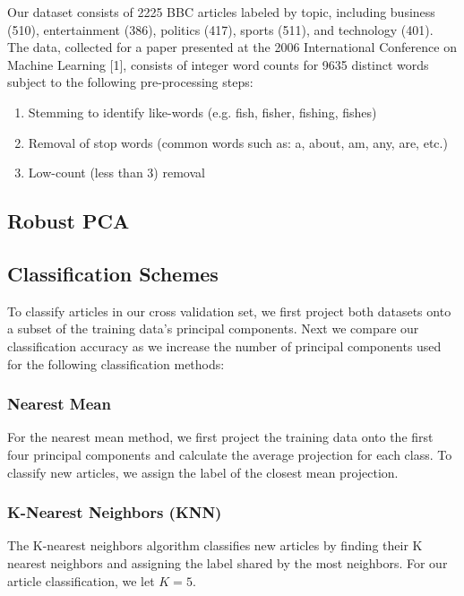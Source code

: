 \documentclass[12pt]{article}
\begin{document}
Our dataset consists of 2225 BBC articles labeled by topic, including business (510), entertainment (386), politics (417), sports (511), and technology (401). The data, collected for a paper presented at the 2006 International Conference on Machine Learning [1], consists of integer word counts for 9635 distinct words subject to the following pre-processing steps:
\begin{enumerate}
\item Stemming to identify like-words (e.g. fish, fisher, fishing, fishes)
\item Removal of stop words (common words such as: a, about, am, any, are, etc.)
\item Low-count (less than 3) removal
\end{enumerate}

\subsection{Robust PCA}

\subsection{Classification Schemes}

To classify articles in our cross validation set, we first project both datasets onto a subset of the training data’s principal components. Next we compare our classification accuracy as we increase the number of principal components used for the following classification methods:

\subsubsection{Nearest Mean}

For the nearest mean method, we first project the training data onto
the first four principal components and calculate the average projection for each class. To classify new articles, we assign the label of the closest mean projection.

\subsubsection{K-Nearest Neighbors (KNN)}

The K-nearest neighbors algorithm classifies new articles by
finding their K nearest neighbors and assigning the label shared by the most neighbors. For our article classification, we let $K = 5$.
\end{document}
